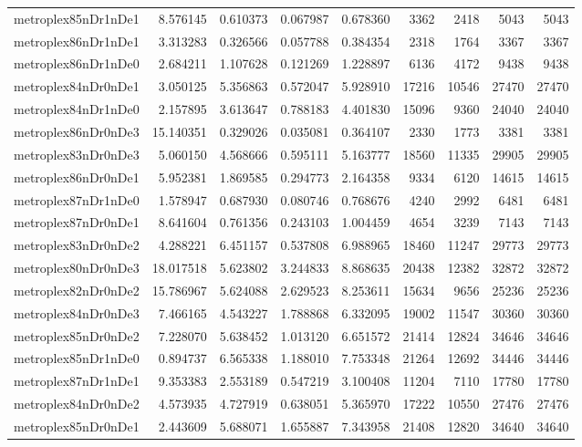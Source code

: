 \begin{longtable}{|l|r|r|r|r|r|r|r|r|}
metroplex85nDr1nDe1 & 8.576145 & 0.610373 & 0.067987 & 0.678360 & 3362 & 2418 & 5043 & 5043 \\
metroplex86nDr1nDe1 & 3.313283 & 0.326566 & 0.057788 & 0.384354 & 2318 & 1764 & 3367 & 3367 \\
metroplex86nDr1nDe0 & 2.684211 & 1.107628 & 0.121269 & 1.228897 & 6136 & 4172 & 9438 & 9438 \\
metroplex84nDr0nDe1 & 3.050125 & 5.356863 & 0.572047 & 5.928910 & 17216 & 10546 & 27470 & 27470 \\
metroplex84nDr1nDe0 & 2.157895 & 3.613647 & 0.788183 & 4.401830 & 15096 & 9360 & 24040 & 24040 \\
metroplex86nDr0nDe3 & 15.140351 & 0.329026 & 0.035081 & 0.364107 & 2330 & 1773 & 3381 & 3381 \\
metroplex83nDr0nDe3 & 5.060150 & 4.568666 & 0.595111 & 5.163777 & 18560 & 11335 & 29905 & 29905 \\
metroplex86nDr0nDe1 & 5.952381 & 1.869585 & 0.294773 & 2.164358 & 9334 & 6120 & 14615 & 14615 \\
metroplex87nDr1nDe0 & 1.578947 & 0.687930 & 0.080746 & 0.768676 & 4240 & 2992 & 6481 & 6481 \\
metroplex87nDr0nDe1 & 8.641604 & 0.761356 & 0.243103 & 1.004459 & 4654 & 3239 & 7143 & 7143 \\
metroplex83nDr0nDe2 & 4.288221 & 6.451157 & 0.537808 & 6.988965 & 18460 & 11247 & 29773 & 29773 \\
metroplex80nDr0nDe3 & 18.017518 & 5.623802 & 3.244833 & 8.868635 & 20438 & 12382 & 32872 & 32872 \\
metroplex82nDr0nDe2 & 15.786967 & 5.624088 & 2.629523 & 8.253611 & 15634 & 9656 & 25236 & 25236 \\
metroplex84nDr0nDe3 & 7.466165 & 4.543227 & 1.788868 & 6.332095 & 19002 & 11547 & 30360 & 30360 \\
metroplex85nDr0nDe2 & 7.228070 & 5.638452 & 1.013120 & 6.651572 & 21414 & 12824 & 34646 & 34646 \\
metroplex85nDr1nDe0 & 0.894737 & 6.565338 & 1.188010 & 7.753348 & 21264 & 12692 & 34446 & 34446 \\
metroplex87nDr1nDe1 & 9.353383 & 2.553189 & 0.547219 & 3.100408 & 11204 & 7110 & 17780 & 17780 \\
metroplex84nDr0nDe2 & 4.573935 & 4.727919 & 0.638051 & 5.365970 & 17222 & 10550 & 27476 & 27476 \\
metroplex85nDr0nDe1 & 2.443609 & 5.688071 & 1.655887 & 7.343958 & 21408 & 12820 & 34640 & 34640 \\

\end{longtable}
